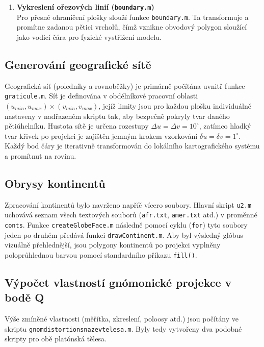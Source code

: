 \documentclass[12pt, a4paper]{article}
\begin{document}
\begin{enumerate}
    \item \textbf{Vykreslení ořezových linií (\texttt{boundary.m})}\\[0.2cm]
    Pro přesné ohraničení plošky slouží funkce \texttt{boundary.m}. Ta transformuje a promítne zadanou pětici vrcholů, čímž vznikne obvodový polygon sloužící jako vodicí čára pro fyzické vystřižení modelu.
\end{enumerate}

\clearpage
\newpage


\subsection{Generování geografické sítě }

Geografická síť (poledníky a rovnoběžky) je primárně počítána uvnitř funkce \texttt{graticule.m}. Síť je definována v obdélníkové pracovní oblasti $(u_{min}, u_{max}) \times (v_{min}, v_{max})$, jejíž limity jsou pro každou plošku individuálně nastaveny v nadřazeném skriptu tak, aby bezpečně pokryly tvar daného pětiúhelníku. Hustota sítě je určena rozestupy $\Delta u = \Delta v = 10^\circ$, zatímco hladký tvar křivek po projekci je zajištěn jemným krokem vzorkování $\delta u = \delta v = 1^\circ$. Každý bod čáry je iterativně transformován do lokálního kartografického systému a promítnut na rovinu.

\subsection{Obrysy kontinentů}

Zpracování kontinentů bylo navrženo napříč vícero soubory. Hlavní skript \texttt{u2.m} uchovává seznam všech textových souborů (\texttt{afr.txt}, \texttt{amer.txt} atd.) v proměnné \texttt{conts}. Funkce \texttt{createGlobeFace.m} následně pomocí cyklu (\texttt{for}) tyto soubory jeden po druhém předává funkci \texttt{drawContinent.m}. Aby byl výsledný glóbus vizuálně přehlednější, jsou polygony kontinentů po projekci vyplněny poloprůhlednou barvou pomocí standardního příkazu \texttt{fill()}.

\subsection{Výpočet vlastností gnómonické projekce v bodě Q}
Výše zmíněné vlastnosti (měřítka, zkreslení, poloosy atd.) jsou počítány ve skriptu \texttt{gnom\textunderscore distortions\textunderscore nazev\textunderscore telesa.m}. Byly tedy vytvořeny dva podobné skripty pro obě platónská tělesa. 
\end{document}
